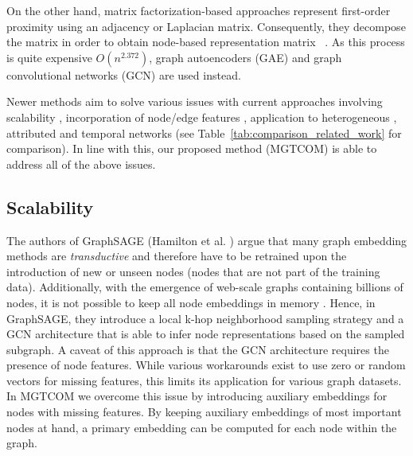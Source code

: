 On the other hand, matrix factorization-based approaches represent first-order proximity using an adjacency or Laplacian matrix. Consequently, they decompose the matrix in order to obtain node-based representation matrix ~\cite{brunaSpectralNetworksLocally2014}.
As this process is quite expensive $O(n^{2.372})$, graph autoencoders (GAE) \cite{tianLearningDeepRepresentations2014, kipfVariationalGraphAutoEncoders2016} and graph convolutional networks (GCN) \cite{kipfSemiSupervisedClassificationGraph2017} are used instead.

Newer methods aim to solve various issues with current approaches involving scalability \cite{hamiltonInductiveRepresentationLearning2017, yingGraphConvolutionalNeural2018}, incorporation of node/edge features \cite{hamiltonInductiveRepresentationLearning2017, wuAuthor2VecFrameworkGenerating2020}, application to heterogeneous \cite{bordesTranslatingEmbeddingsModeling2013, dongMetapath2vecScalableRepresentation2017, huHeterogeneousGraphTransformer2020}, attributed \cite{chenCatGCNGraphConvolutional2021, wuTopologicalMachineLearning2020} and temporal \cite{nguyenContinuousTimeDynamicNetwork2018, dasguptaHyTEHyperplanebasedTemporally2018, wuSageDyNovelSampling2021} networks (see Table~\ref{tab:comparison_related_work} for comparison). In line with this, our proposed method (MGTCOM) is able to address all of the above issues.  

\subsection{Scalability}
The authors of GraphSAGE (Hamilton et al. \cite{hamiltonInductiveRepresentationLearning2017}) argue that many graph embedding methods are \textit{transductive} and therefore have to be retrained upon the introduction of new or unseen nodes (nodes that are not part of the training data). 
Additionally, with the emergence of web-scale graphs containing billions of nodes, it is not possible to keep all node embeddings in memory \cite{yingGraphConvolutionalNeural2018}. 
Hence, in GraphSAGE, they introduce a local k-hop neighborhood sampling strategy and a GCN architecture that is able to infer node representations based on the sampled subgraph. 
A caveat of this approach is that the GCN architecture requires the presence of node features. While various workarounds exist to use zero or random vectors for missing features, this limits its application for various graph datasets.
In MGTCOM we overcome this issue by introducing auxiliary embeddings for nodes with missing features. By keeping auxiliary embeddings of most important nodes at hand, a primary embedding can be computed for each node within the graph.

